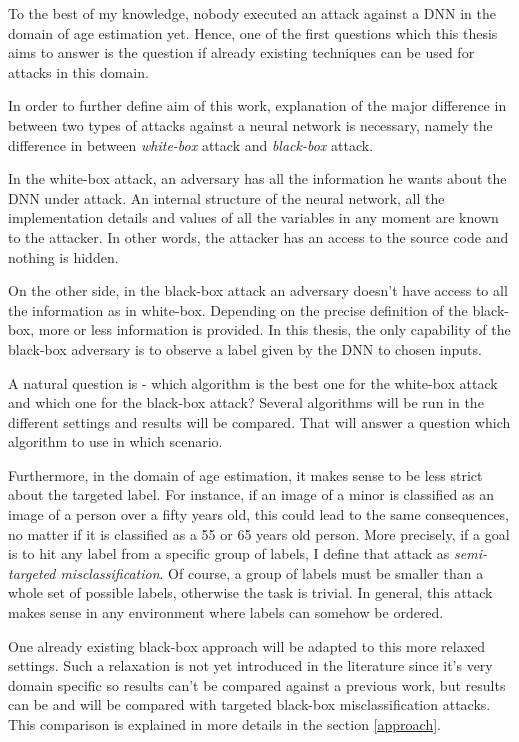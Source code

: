 To the best of my knowledge, nobody executed an attack against a DNN in the domain of age estimation yet. Hence, one of the first questions which this thesis aims to answer is the question if already existing techniques can be used for attacks in this domain.

In order to further define aim of this work, explanation of the major difference in between two types of attacks against a neural network is necessary, namely the difference in between \textit{white-box} attack and \textit{black-box} attack. 

In the white-box attack, an adversary has all the information he wants about the DNN under attack. An internal structure of the neural network, all the implementation details and values of all the variables in any moment are known to the attacker. In other words, the attacker has an access to the source code and nothing is hidden.

On the other side, in the black-box attack an adversary doesn't have access to all the information as in white-box. Depending on the precise definition of the black-box, more or less information is provided. In this thesis, the only capability of the black-box adversary is to observe a label given by the DNN to chosen inputs.

A natural question is - which algorithm is the best one for the white-box attack and which one for the black-box attack? Several algorithms will be run in the different settings and results will be compared. That will answer a question which algorithm to use in which scenario.

Furthermore, in the domain of age estimation, it makes sense to be less strict about the targeted label. For instance, if an image of a minor is classified as an image of a person over a fifty years old, this could lead to the same consequences, no matter if it is classified as a 55 or 65 years old person. More precisely, if a goal is to hit any label from a specific group of labels, I define that attack as \textit{semi-targeted misclassification}. Of course, a group of labels must be smaller than a whole set of possible labels, otherwise the task is trivial. In general, this attack makes sense in any environment where labels can somehow be ordered.

One already existing black-box approach will be adapted to this more relaxed settings. Such a relaxation is not yet introduced in the literature since it's very domain specific so results can't be compared against a previous work, but results can be and will be compared with targeted black-box misclassification attacks. This comparison is explained in more details in the section \ref{approach}. 

